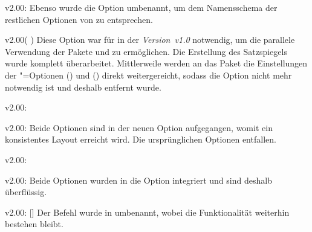 \begin{Obsolete}{v2.00:}{}
\printobsoletelist%
%
Ebenso wurde die Option  umbenannt, um dem Namensschema der 
restlichen Optionen von \TUDScript zu entsprechen.
\end{Obsolete}

\begin{Obsolete}{v2.00}{}(%
)
\printobsoletelist%
%
Diese Option war für \TUDScript in der \emph{Version~v1.0} notwendig, um die 
parallele Verwendung der Pakete  und  zu 
ermöglichen. Die Erstellung des Satzspiegels wurde komplett überarbeitet. 
Mittlerweile werden an das Paket  die Einstellungen der 
\KOMAScript"=Optionen () und 
() direkt weitergereicht, sodass die 
Option  nicht mehr notwendig ist und deshalb entfernt wurde.
\end{Obsolete}

\begin{Obsolete}{v2.00:}{%
}
\begin{Obsolete}{v2.00:}{%
}
\printobsoletelist%
%
Beide Optionen sind in der neuen Option  
aufgegangen, womit ein konsistentes Layout erreicht wird. Die ursprünglichen 
Optionen entfallen. 
\end{Obsolete}
\end{Obsolete}

\begin{Obsolete}{v2.00:}{}
\begin{Obsolete}{v2.00:}{}
\printobsoletelist%
%
Beide Optionen wurden in die Option  integriert und sind 
deshalb überflüssig.
\end{Obsolete}
\end{Obsolete}

\begin{Obsolete}{v2.00:}{%
  []%
}
\printobsoletelist%
%
Der Befehl  wurde in  umbenannt, wobei die 
Funktionalität weiterhin bestehen bleibt.
\end{Obsolete}

